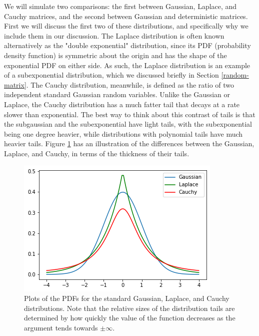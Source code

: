 \documentclass[12pt,a4paper]{amsart}
\numberwithin{equation}{section}
\theoremstyle{plain}
\theoremstyle{definition}
\begin{document}
We will simulate two comparisons: the first between Gaussian, Laplace, and Cauchy matrices, and the second between Gaussian and deterministic matrices. First we will discuss the first two of these distributions, and specifically why we include them in our discussion. The Laplace distribution is often known alternatively as the "double exponential" distribution, since its PDF (probability density function) is symmetric about the origin and has the shape of the exponential PDF on either side. As such, the Laplace distribution is an example of a subexponential distribution, which we discussed briefly in Section \ref{random-matrix}. The Cauchy distribution, meanwhile, is defined as the ratio of two independent standard Gaussian random variables. Unlike the Gaussian or Laplace, the Cauchy distribution has a much fatter tail that decays at a rate slower than exponential. The best way to think about this contrast of tails is that the subgaussian and the subexponential have light tails, with the subexponential being one degree heavier, while distributions with polynomial tails have much heavier tails. Figure \ref{density-plot} has an illustration of the differences between the Gaussian, Laplace, and Cauchy, in terms of the thickness of their tails.

\begin{figure}
    \centering
    \includegraphics[scale = 0.7]{density_plot_final.png}
    \caption{Plots of the PDFs for the standard Gaussian, Laplace, and Cauchy distributions. Note that the relative sizes of the distribution tails are determined by how quickly the value of the function decreases as the argument tends towards $\pm\infty$.}
    \label{density-plot}
\end{figure}
\end{document}
